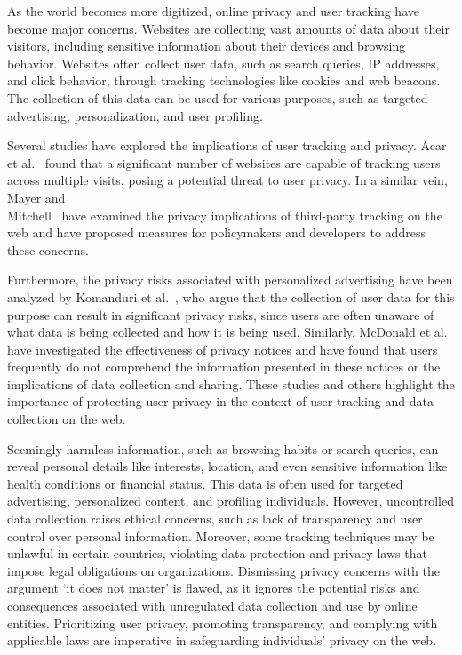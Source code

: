 
As the world becomes more digitized, online privacy and user tracking have become major concerns. Websites are collecting vast amounts of data about their visitors, including sensitive information about their devices and browsing behavior. Websites often collect user data, such as search queries, IP addresses, and click behavior, through tracking technologies like cookies and web beacons. The collection of this data can be used for various purposes, such as targeted advertising, personalization, and user profiling.
 
Several studies have explored the implications of user tracking and privacy. Acar et al.~ found that a significant number of websites are capable of tracking users across multiple visits, posing a potential threat to user privacy. In a similar vein, Mayer and \\ Mitchell~ have examined the privacy implications of third-party tracking on the web and have proposed measures for policymakers and developers to address these concerns.

Furthermore, the privacy risks associated with personalized advertising have been analyzed by Komanduri et al.~, who argue that the collection of user data for this purpose can result in significant privacy risks, since users are often unaware of what data is being collected and how it is being used. Similarly, McDonald et al.~ have investigated the effectiveness of privacy notices and have found that users frequently do not comprehend the information presented in these notices or the implications of data collection and sharing. These studies and others highlight the importance of protecting user privacy in the context of user tracking and data collection on the web.

Seemingly harmless information, such as browsing habits or search queries, can reveal personal details like interests, location, and even sensitive information like health conditions or financial status. This data is often used for targeted advertising, personalized content, and profiling individuals. However, uncontrolled data collection raises ethical concerns, such as lack of transparency and user control over personal information. Moreover, some tracking techniques may be unlawful in certain countries, violating data protection and privacy laws that impose legal obligations on organizations. Dismissing privacy concerns with the argument `it does not matter' is flawed, as it ignores the potential risks and consequences associated with unregulated data collection and use by online entities. Prioritizing user privacy, promoting transparency, and complying with applicable laws are imperative in safeguarding individuals' privacy on the web.

